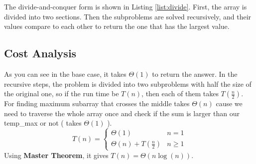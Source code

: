 The divide-and-conquer form is shown in Listing 
\ref{list:divide}. First, the array is divided into two 
sections. Then the subproblems are solved 
recursively, and their values compare to each 
other to return the one that has the largest value.
\subsection{Cost Analysis}
As you can see in the base case, it takes 
$\Theta(1)$ to return the answer. In the 
recursive steps, the problem is divided into 
two subproblems with half the size of the 
original one, so if the run time be $T(n)$, 
then each of them takes $T(\frac{n}{2})$. For 
finding maximum subarray that crosses the 
middle takes $\Theta(n)$ cause we need to 
traverse the whole array once and check if 
the sum is larger than our temp\_max or not
( takes $\Theta(1)$ ).
\[
    T(n)=\begin{cases}
        \Theta(1) & n=1\\
        \Theta(n) + T(\frac{n}{2}) & n \geq 1
    \end{cases}
    \]
Using \textbf{Master Theorem}, it gives $T(n) = \Theta(n\log(n))$.